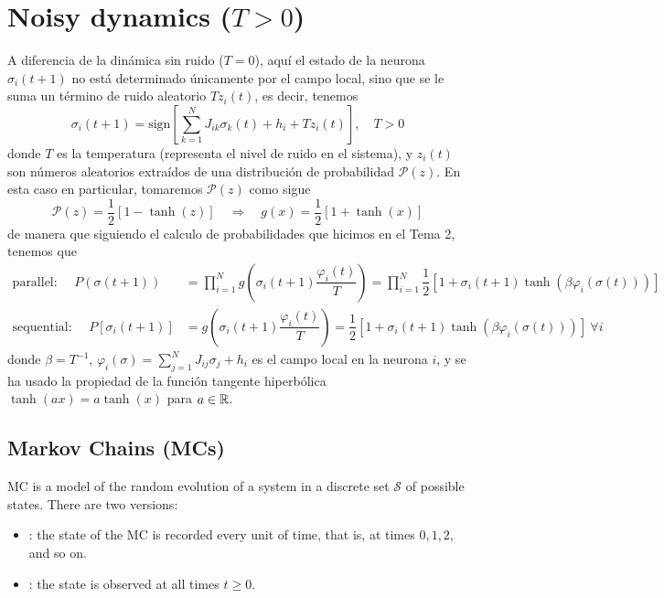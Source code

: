 \section{Noisy dynamics ($T>0$)}
A diferencia de la dinámica sin ruido ($T=0$), aquí el estado de la neurona $\sigma_i(t+1)$ no está determinado únicamente por el campo local, sino que se le suma un término de ruido aleatorio $T z_i(t)$, es decir, tenemos
$$\sigma_i(t+1) = \text{sign}\left[\sum_{k=1}^N J_{ik}\sigma_k(t) + h_i + T z_i(t)\right], \quad T > 0$$
donde $T$ es la temperatura (representa el nivel de ruido en el sistema), y $z_i(t)$ son números aleatorios extraídos de una distribución de probabilidad $\mathcal{P}(z)$. En esta caso en particular, tomaremos $\mathcal{P}(z)$ como sigue 
\begin{equation*}
    \mathcal{P}(z) = \dfrac{1}{2} [1-\tanh(z)] \quad \Longrightarrow \quad g(x) = \dfrac{1}{2} [1 + \tanh(x)]
\end{equation*}
de manera que siguiendo el calculo de probabilidades que hicimos en el Tema 2, tenemos que 
\begin{align*}
    \text{parallel: } \quad P(\sigma(t+1)) &= \prod_{i=1}^N g\left(\sigma_i(t+1)\dfrac{\varphi_i(t)}{T}\right)= \prod_{i=1}^N \dfrac{1}{2}\left[1+\sigma_i(t+1)\tanh\left(\beta \varphi_i(\sigma(t))\right)\right] \\
    \text{sequential: } \quad P[\sigma_i(t+1)] &= g\left(\sigma_i(t+1)\dfrac{\varphi_i(t)}{T}\right)= \dfrac{1}{2}\left[1+\sigma_i(t+1)\tanh\left(\beta \varphi_i(\sigma(t))\right)\right] \ \forall i
\end{align*}
donde $\beta=T^{-1}$, $\varphi_i(\sigma) = \sum\limits_{j=1}^N J_{ij}\sigma_j + h_i$ es el campo local en la neurona $i$, y se ha usado la propiedad de la función tangente hiperbólica $\tanh(ax) = a\tanh(x)$ para $a\in \mathbb{R}$. \\

\subsection{Markov Chains (MCs)}

\noindent
MC is a model of the random evolution of a system in a discrete set $\mathcal{S}$ of possible states. There are two versions:
\begin{itemize}
    \item {}: the state of the MC is recorded every unit of time, that is, at times $0, 1, 2,$ and so on.
    \item {}: the state is observed at all times $t \geq 0$.
\end{itemize}

